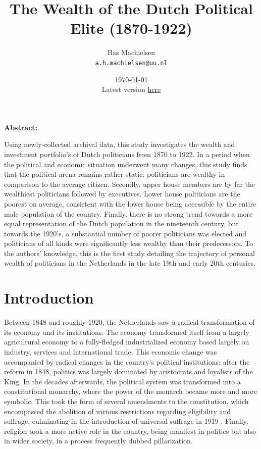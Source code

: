 
\usepackage[utf8]{inputenc}

\title{The Wealth of the Dutch Political Elite (1870-1922)}
\author{
  Bas Machielsen\\
  \texttt{a.h.machielsen@uu.nl}
}

\date{\today \\
Latest version \href{https://bas-m.netlify.app/The_Wealth_of_Dutch_Politicians__1870_1922_.pdf}{here}}



\maketitle

\begin{center}
\textbf{Abstract:}
\end{center}
    Using newly-collected archival data, this study investigates the wealth and investment portfolio's of Dutch politicians from 1870 to 1922. In a period when the political and economic situation underwent many changes, this study finds that the political arena remains rather static: politicians are wealthy in comparison to the average citizen. Secondly, upper house members are by far the wealthiest politicians followed by executives. Lower house politicians are the poorest on average, consistent with the lower house being accessible by the entire male population of the country. Finally, there is no strong trend towards a more equal representation of the Dutch population in the nineteenth century, but towards the 1920's, a substantial number of poorer politicians was elected and politicians of all kinds were significantly less wealthy than their predecessors. To the authors' knowledge, this is the first study detailing the trajectory of personal wealth of politicians in the Netherlands in the late 19th and early 20th centuries.
\clearpage

\section{Introduction}
    
    Between 1848 and roughly 1920, the Netherlands saw a radical transformation of its economy and its institutions. The economy transformed itself from a largely agricultural economy to a fully-fledged industrialized economy based largely on industry, services and international trade.\autocite{van2004strictures} This economic change was accompanied by radical changes in the country’s political institutions: after the reform in 1848, politics was largely dominated by aristocrats and loyalists of the King. In the decades afterwards, the political system was transformed into a constitutional monarchy, where the power of the monarch became more and more symbolic. This took the form of several amendments to the constitution, which encompassed the abolition of various restrictions regarding eligibility and suffrage, culminating in the introduction of universal suffrage in 1919 \autocite{van2018tussen}. Finally, religion took a more active role in the country, being manifest in politics but also in wider society, in a process frequently dubbed pillarization. 

